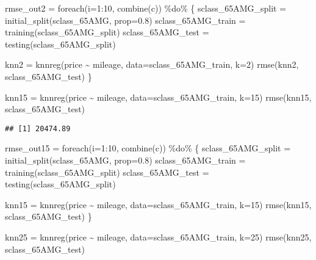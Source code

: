 \documentclass[
]{article}
\newenvironment{Shaded}{\begin{snugshade}}{\end{snugshade}}
\newcommand{\AttributeTok}[1]{\textcolor[rgb]{0.77,0.63,0.00}{#1}}
\newcommand{\DecValTok}[1]{\textcolor[rgb]{0.00,0.00,0.81}{#1}}
\newcommand{\FloatTok}[1]{\textcolor[rgb]{0.00,0.00,0.81}{#1}}
\newcommand{\FunctionTok}[1]{\textcolor[rgb]{0.00,0.00,0.00}{#1}}
\newcommand{\NormalTok}[1]{#1}
\newcommand{\OtherTok}[1]{\textcolor[rgb]{0.56,0.35,0.01}{#1}}
\newcommand{\SpecialCharTok}[1]{\textcolor[rgb]{0.00,0.00,0.00}{#1}}
\newcommand{\StringTok}[1]{\textcolor[rgb]{0.31,0.60,0.02}{#1}}
\begin{document}
\begin{Shaded}
\begin{Highlighting}[]
\NormalTok{rmse\_out2 }\OtherTok{=} \FunctionTok{foreach}\NormalTok{(}\AttributeTok{i=}\DecValTok{1}\SpecialCharTok{:}\DecValTok{10}\NormalTok{, }\FunctionTok{combine}\NormalTok{(}\StringTok{\textquotesingle{}c\textquotesingle{}}\NormalTok{)) }\SpecialCharTok{\%do\%}\NormalTok{ \{}
\NormalTok{  sclass\_65AMG\_split }\OtherTok{=} \FunctionTok{initial\_split}\NormalTok{(sclass\_65AMG, }\AttributeTok{prop=}\FloatTok{0.8}\NormalTok{)}
\NormalTok{  sclass\_65AMG\_train }\OtherTok{=} \FunctionTok{training}\NormalTok{(sclass\_65AMG\_split)}
\NormalTok{  sclass\_65AMG\_test }\OtherTok{=} \FunctionTok{testing}\NormalTok{(sclass\_65AMG\_split)}
  
\NormalTok{  knn2 }\OtherTok{=} \FunctionTok{knnreg}\NormalTok{(price }\SpecialCharTok{\textasciitilde{}}\NormalTok{ mileage, }\AttributeTok{data=}\NormalTok{sclass\_65AMG\_train, }\AttributeTok{k=}\DecValTok{2}\NormalTok{)}
  \FunctionTok{rmse}\NormalTok{(knn2, sclass\_65AMG\_test)}
\NormalTok{\}}

\NormalTok{knn15 }\OtherTok{=} \FunctionTok{knnreg}\NormalTok{(price }\SpecialCharTok{\textasciitilde{}}\NormalTok{ mileage, }\AttributeTok{data=}\NormalTok{sclass\_65AMG\_train, }\AttributeTok{k=}\DecValTok{15}\NormalTok{)}
\FunctionTok{rmse}\NormalTok{(knn15, sclass\_65AMG\_test)}
\end{Highlighting}
\end{Shaded}

\begin{verbatim}
## [1] 20474.89
\end{verbatim}

\begin{Shaded}
\begin{Highlighting}[]
\NormalTok{rmse\_out15 }\OtherTok{=} \FunctionTok{foreach}\NormalTok{(}\AttributeTok{i=}\DecValTok{1}\SpecialCharTok{:}\DecValTok{10}\NormalTok{, }\FunctionTok{combine}\NormalTok{(}\StringTok{\textquotesingle{}c\textquotesingle{}}\NormalTok{)) }\SpecialCharTok{\%do\%}\NormalTok{ \{}
\NormalTok{  sclass\_65AMG\_split }\OtherTok{=} \FunctionTok{initial\_split}\NormalTok{(sclass\_65AMG, }\AttributeTok{prop=}\FloatTok{0.8}\NormalTok{)}
\NormalTok{  sclass\_65AMG\_train }\OtherTok{=} \FunctionTok{training}\NormalTok{(sclass\_65AMG\_split)}
\NormalTok{  sclass\_65AMG\_test }\OtherTok{=} \FunctionTok{testing}\NormalTok{(sclass\_65AMG\_split)}
  
\NormalTok{  knn15 }\OtherTok{=} \FunctionTok{knnreg}\NormalTok{(price }\SpecialCharTok{\textasciitilde{}}\NormalTok{ mileage, }\AttributeTok{data=}\NormalTok{sclass\_65AMG\_train, }\AttributeTok{k=}\DecValTok{15}\NormalTok{)}
  \FunctionTok{rmse}\NormalTok{(knn15, sclass\_65AMG\_test)}
\NormalTok{\}}

\NormalTok{knn25 }\OtherTok{=} \FunctionTok{knnreg}\NormalTok{(price }\SpecialCharTok{\textasciitilde{}}\NormalTok{ mileage, }\AttributeTok{data=}\NormalTok{sclass\_65AMG\_train, }\AttributeTok{k=}\DecValTok{25}\NormalTok{)}
\FunctionTok{rmse}\NormalTok{(knn25, sclass\_65AMG\_test)}
\end{Highlighting}
\end{Shaded}
\end{document}
